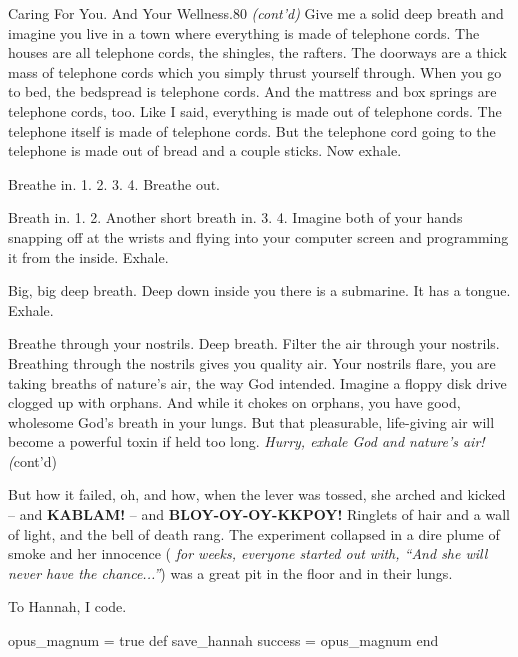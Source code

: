 \documentclass[12pt,twoside]{report}
\begin{document}
	\begin{sidebar}{Caring For You. And Your Wellness.}{80}
		\textit{(cont'd)} Give me a solid deep breath and imagine you live in a town where everything is made of telephone cords. The houses are all telephone cords, the shingles, the rafters. The doorways are a thick mass of telephone cords which you simply thrust yourself through. When you go to bed, the bedspread is telephone cords. And the mattress and box springs are telephone cords, too. Like I said, everything is made out of telephone cords. The telephone itself is made of telephone cords. But the telephone cord going to the telephone is made out of bread and a couple sticks. Now exhale.\vspace{6px}
		
		Breathe in. 1. 2. 3. 4. Breathe out.\vspace{6px}

		Breath in. 1. 2. Another short breath in. 3. 4. Imagine both of your hands snapping off at the wrists and flying into your computer screen and programming it from the inside. Exhale.\vspace{6px}

		Big, big deep breath. Deep down inside you there is a submarine. It has a tongue. Exhale.\vspace{6px}
		
		Breathe through your nostrils. Deep breath. Filter the air through your nostrils. Breathing through the nostrils gives you quality air. Your nostrils flare, you are taking breaths of nature's air, the way God intended. Imagine a floppy disk drive clogged up with orphans. And while it chokes on orphans, you have good, wholesome God's breath in your lungs. But that pleasurable, life-giving air will become a powerful toxin if held too long. \textit{Hurry, exhale God and nature's air!} \textit(cont'd)
	\end{sidebar}

But how it failed, oh, and how, when the lever was tossed, she arched
and kicked -- and {\bf KABLAM!} -- and {\bf BLOY-OY-OY-KKPOY!}
Ringlets of hair and a wall of light, and the bell of death rang.  The
experiment collapsed in a dire plume of smoke and her innocence ({\em
  for weeks, everyone started out with, ``And she will never have the
  chance...''}) was a great pit in the floor and in their lungs.

To Hannah, I code.


\begin{rubycode}

 opus_magnum = true
 def save_hannah
   success = opus_magnum
 end

\end{rubycode}
\end{document}
